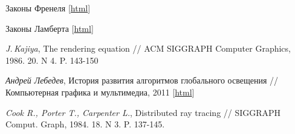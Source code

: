 \begin{thebibliography}{99}
  Законы Френеля
  [\href{http://ru.wikipedia.org/wiki/%D0%A4%D0%BE%D1%80%D0%BC%D1%83%D0%BB%D1%8B_%D0%A4%D1%80%D0%B5%D0%BD%D0%B5%D0%BB%D1%8F}
  {html}]

  Законы Ламберта
  [\href{http://ru.wikipedia.org/wiki/%D0%97%D0%B0%D0%BA%D0%BE%D0%BD_%D0%9B%D0%B0%D0%BC%D0%B1%D0%B5%D1%80%D1%82%D0%B0}
  {html}]

  \textit{J.\,Kajiya}, The rendering equation
  // ACM SIGGRAPH Computer Graphics, 1986. 20. N 4. P. 143-150

  \textit{Андрей Лебедев}, История развития алгоритмов глобального освещения
  // Компьютерная графика и мультимедиа, 2011
  [\href{http://cgm.computergraphics.ru/issues/issue19/globalillum}
  {html}]

  \textit{Cook R., Porter T., Carpenter L.}, Distributed ray tracing
  // SIGGRAPH Comput. Graph, 1984. 18. N 3. P. 137-145.

\end{thebibliography}
